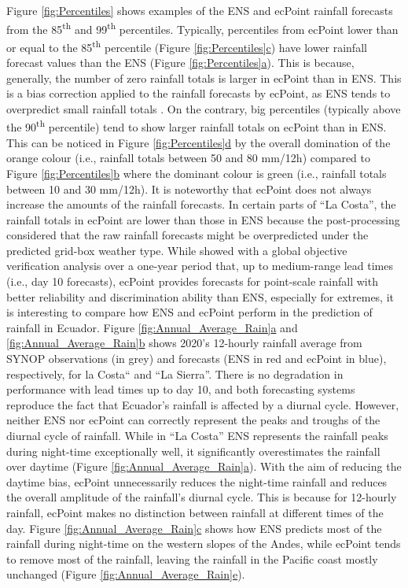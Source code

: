 \documentclass[techmemo]{ecmwfrep}%
\begin{document}
Figure \ref{fig:Percentiles} shows examples of the ENS and ecPoint rainfall forecasts from the 85\textsuperscript{th} and 99\textsuperscript{th} percentiles. Typically, percentiles from ecPoint lower than or equal to the 85\textsuperscript{th} percentile (Figure \ref{fig:Percentiles}\hyperref[fig:Percentiles]{c}) have lower rainfall forecast values than the ENS (Figure \ref{fig:Percentiles}\hyperref[fig:Percentiles]{a}). This is because, generally, the number of zero rainfall totals is larger in ecPoint than in ENS. This is a bias correction applied to the rainfall forecasts by ecPoint, as ENS tends to overpredict small rainfall totals \citep{Haiden2023}. On the contrary, big percentiles (typically above the 90\textsuperscript{th} percentile) tend to show larger rainfall totals on ecPoint than in ENS. This can be noticed in Figure \ref{fig:Percentiles}\hyperref[fig:Percentiles]{d} by the overall domination of the orange colour (i.e., rainfall totals between 50 and 80 mm/12h) compared to Figure \ref{fig:Percentiles}\hyperref[fig:Percentiles]{b} where the dominant colour is green (i.e., rainfall totals between 10 and 30 mm/12h).  It is noteworthy that ecPoint does not always increase the amounts of the rainfall forecasts.  In certain parts of “La Costa”, the rainfall totals in ecPoint are lower than those in ENS because the post-processing considered that the raw rainfall forecasts might be overpredicted under the predicted grid-box weather type. While \cite{Hewson2021} showed with a global objective verification analysis over a one-year period that, up to medium-range lead times (i.e., day 10 forecasts), ecPoint provides forecasts for point-scale rainfall with better reliability and discrimination ability than ENS, especially for extremes, it is interesting to compare how ENS and ecPoint perform in the prediction of rainfall in Ecuador. Figure \ref{fig:Annual_Average_Rain}\hyperref[fig:Annual_Average_Rain]{a} and \ref{fig:Annual_Average_Rain}\hyperref[fig:Annual_Average_Rain]{b} shows 2020’s 12-hourly rainfall average from SYNOP observations (in grey) and forecasts (ENS in red and ecPoint in blue), respectively, for la Costa“ and “La Sierra”. There is no degradation in performance with lead times up to day 10, and both forecasting systems reproduce the fact that Ecuador’s rainfall is affected by a diurnal cycle. However, neither ENS nor ecPoint can correctly represent the peaks and troughs of the diurnal cycle of rainfall. While in “La Costa” ENS represents the rainfall peaks during night-time exceptionally well, it significantly overestimates the rainfall over daytime (Figure \ref{fig:Annual_Average_Rain}\hyperref[fig:Annual_Average_Rain]{a}). With the aim of reducing the daytime bias, ecPoint unnecessarily reduces the night-time rainfall and reduces the overall amplitude of the rainfall’s diurnal cycle. This is because for 12-hourly rainfall, ecPoint makes no distinction between rainfall at different times of the day. Figure \ref{fig:Annual_Average_Rain}\hyperref[fig:Annual_Average_Rain]{c} shows how ENS predicts most of the rainfall during night-time on the western slopes of the Andes, while ecPoint tends to remove most of the rainfall, leaving the rainfall in the Pacific coast mostly unchanged (Figure \ref{fig:Annual_Average_Rain}\hyperref[fig:Annual_Average_Rain]{e}). 
\end{document}
